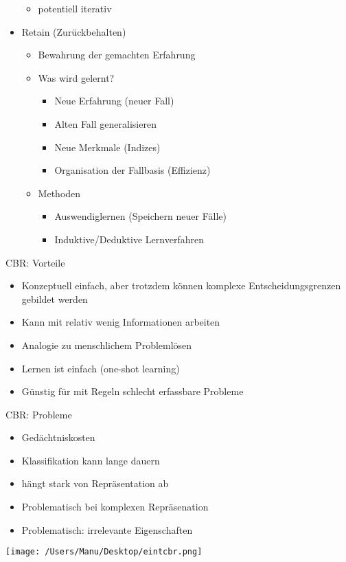 \documentclass[paper=a4, fontsize=11pt]{scrartcl} %
\numberwithin{equation}{section} %
\numberwithin{figure}{section} %
\numberwithin{table}{section} %
\begin{document}
\begin{itemize}
\begin{itemize}
\item potentiell iterativ
\end{itemize}
\item Retain (Zurückbehalten)
\begin{itemize}
\item Bewahrung der gemachten Erfahrung
\item Was wird gelernt?
\begin{itemize}
\item Neue Erfahrung (neuer Fall)
\item Alten Fall generalisieren
\item Neue Merkmale (Indizes)
\item Organisation der Fallbasis (Effizienz)
\end{itemize}
\item Methoden
\begin{itemize}
\item Auswendiglernen (Speichern neuer Fälle)
\item Induktive/Deduktive Lernverfahren
\end{itemize}
\end{itemize}
\end{itemize}

CBR: Vorteile
\begin{itemize}
\item Konzeptuell einfach, aber trotzdem können komplexe Entscheidungsgrenzen gebildet werden
\item Kann mit relativ wenig Informationen arbeiten
\item Analogie zu menschlichem Problemlösen
\item Lernen ist einfach (one-shot learning)
\item Günstig für mit Regeln schlecht erfassbare Probleme
\end{itemize}

CBR: Probleme
\begin{itemize}
\item Gedächtniskosten
\item Klassifikation kann lange dauern
\item hängt stark von Repräsentation ab
\item Problematisch bei komplexen Repräsenation
\item Problematisch: irrelevante Eigenschaften
\end{itemize}

\texttt{[image: /Users/Manu/Desktop/eintcbr.png]}
\end{document}
